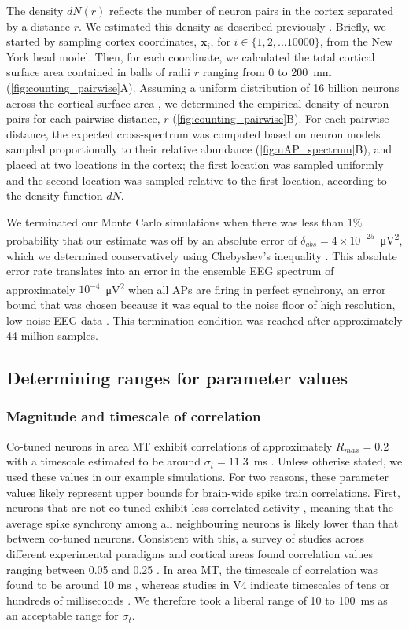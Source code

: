 The density $dN(r)$ reflects the number of neuron pairs in the cortex separated by a distance $r$. We estimated this density as described previously \cite{Brake2024}. Briefly, we started by sampling cortex coordinates, $\bm{x}_i$, for $i\in\{1,2,...10000\}$, from the New York head model. Then, for each coordinate, we calculated the total cortical surface area contained in balls of radii $r$ ranging from 0 to 200~\unit{\milli\meter}  ({\autoref{fig:counting_pairwise}A}). Assuming a uniform distribution of 16 billion neurons across the cortical surface area \cite{Azevedo2009}, we determined the empirical density of neuron pairs for each pairwise distance, $r$ ({\autoref{fig:counting_pairwise}B}). For each pairwise distance, the expected cross-spectrum was computed based on neuron models sampled proportionally to their relative abundance ({\autoref{fig:uAP_spectrum}B}), and placed at two locations in the cortex; the first location was sampled uniformly and the second location was sampled relative to the first location, according to the density function $dN$.

We terminated our Monte Carlo simulations when there was less than 1\% probability that our estimate was off by an absolute error of $\delta_{abs} = 4\times10^{-25}$~\unit{\micro\volt^2}, which we determined conservatively using Chebyshev's inequality \cite{Bicher2022, Robert2004}. This absolute error rate translates into an error in the ensemble EEG spectrum of approximately $10^{-4}$~\unit{\micro\volt^2} when all APs are firing in perfect synchrony, an error bound that was chosen because it was equal to the noise floor of high resolution, low noise EEG data \cite{Scheer2006}. This termination condition was reached after approximately 44 million samples.

\subsection{Determining ranges for parameter values}
\subsubsection{Magnitude and timescale of correlation}
Co-tuned neurons in area MT exhibit correlations of approximately $R_{max}=0.2$ with a timescale estimated to be around $\sigma_t=11.3$~\unit{\milli\second} \cite{Bair2001}. Unless otherise stated, we used these values in our example simulations. For two reasons, these parameter values likely represent upper bounds for brain-wide spike train correlations. First, neurons that are not co-tuned exhibit less correlated activity \cite{Kohn2005}, meaning that the average spike synchrony among all neighbouring neurons is likely lower than that between co-tuned neurons. Consistent with this, a survey of studies across different experimental paradigms and cortical areas found correlation values ranging between 0.05 and 0.25  \cite{Cohen2011}. In area MT, the timescale of correlation was found to be around 10 ms \cite{Bair2001}, whereas studies in V4 indicate timescales of tens or hundreds of milliseconds \cite{Mitchell2009,Smith2013}. We therefore took a liberal range of 10 to 100~\unit{\milli\second} as an acceptable range for $\sigma_t$.

